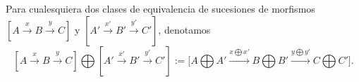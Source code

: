 \documentclass[preview]{standalone}
\begin{document}
\begin{center}
Para cualesquiera dos clases de equivalencia de sucesiones de morfismos $[A\xrightarrow{x}B\xrightarrow{y}C]$ y $[A'\xrightarrow{x'}B'\xrightarrow{y'}C']$, denotamos $$[A\xrightarrow{x}B\xrightarrow{y}C]\bigoplus[A'\xrightarrow{x'}B'\xrightarrow{y'}C'] := \bigg[A\bigoplus A' \xrightarrow{x\bigoplus x'} B\bigoplus B' \xrightarrow{y\bigoplus y'} C\bigoplus C'\bigg].$$
\end{center}
\end{document}
